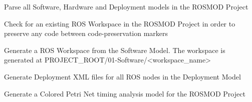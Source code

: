 \documentclass[letterpaper,10pt,english]{sphinxmanual}
\begin{document}
\begin{fulllineitems}
\begin{fulllineitems}
\begin{quote}
\begin{description}
\end{description}\end{quote}

\end{fulllineitems}


\begin{fulllineitems}
\label{class_Project:ROSMOD_Project.parse_models}
Parse all Software, Hardware and Deployment models in the ROSMOD Project

\end{fulllineitems}


\begin{fulllineitems}
\label{class_Project:ROSMOD_Project.check_workspace}
Check for an existing ROS Workspace in the ROSMOD Project in order to preserve any code between code-preservation markers

\end{fulllineitems}


\begin{fulllineitems}
\label{class_Project:ROSMOD_Project.generate_workspace}
Generate a ROS Workspace from the Software Model. The workspace is generated at PROJECT\_ROOT/01-Software/\textless{}workspace\_name\textgreater{}

\end{fulllineitems}


\begin{fulllineitems}
\label{class_Project:ROSMOD_Project.generate_xml}
Generate Deployment XML files for all ROS nodes in the Deployment Model

\end{fulllineitems}


\begin{fulllineitems}
\label{class_Project:ROSMOD_Project.generate_cpn}
Generate a Colored Petri Net timing analysis model for the ROSMOD Project


\end{fulllineitems}
\end{fulllineitems}
\end{document}
